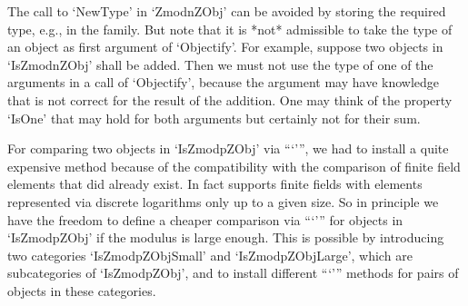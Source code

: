 The call to `NewType' in `ZmodnZObj' can be avoided by storing
the required type, e.g., in the family.
But note that it is *not* admissible to take the type of an object
as first argument of `Objectify'.
For example, suppose two objects in `IsZmodnZObj' shall be added.
Then we must not use the type of one of the arguments in a call of
`Objectify', because the argument may have knowledge that is not
correct for the result of the addition.
One may think of the property `IsOne' that may hold for both
arguments but certainly not for their sum.

For comparing two objects in `IsZmodpZObj' via ```\<''',
we had to install a quite expensive method because of the compatibility
with the comparison of finite field elements that did already exist.
In fact {\GAP} supports finite fields with elements represented via
discrete logarithms only up to a given size.
So in principle we have the freedom to define a cheaper comparison
via ```\<''' for objects in `IsZmodpZObj' if the modulus is large
enough.
This is possible by introducing two categories `IsZmodpZObjSmall'
and `IsZmodpZObjLarge', which are subcategories of `IsZmodpZObj',
and to install different ```\<''' methods for pairs of objects
in these categories.



